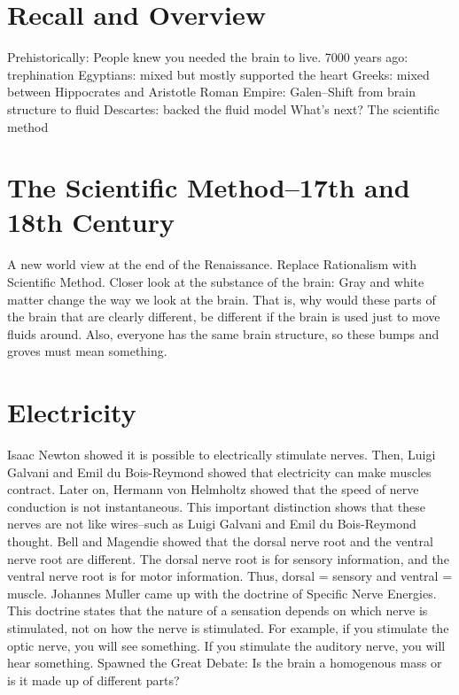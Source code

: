\section{Recall and Overview}

Prehistorically: People knew you needed the brain to live.
7000 years ago: trephination
Egyptians: mixed but mostly supported the heart
Greeks: mixed between Hippocrates and Aristotle
Roman Empire: Galen--Shift from brain structure to fluid
Descartes: backed the fluid model
What's next? The scientific method

\section{The Scientific Method--17th and 18th Century}

A new world view at the end of the Renaissance.
	Replace Rationalism with Scientific Method.
Closer look at the substance of the brain:
    Gray and white matter change the way we look at the brain. That is, why would these parts of the brain that are clearly different, be different if the brain is used just to move fluids around.
    Also, everyone has the same brain structure, so these bumps and groves must mean something.

\section{Electricity}

Isaac Newton showed it is possible to electrically stimulate nerves.
Then, Luigi Galvani and Emil du Bois-Reymond showed that electricity can make muscles contract.
Later on, Hermann von Helmholtz showed that the speed of nerve conduction is not instantaneous.
    This important distinction shows that these nerves are not like wires--such as Luigi Galvani and Emil du Bois-Reymond thought.
Bell and Magendie showed that the dorsal nerve root and the ventral nerve root are different.
    The dorsal nerve root is for sensory information, and the ventral nerve root is for motor information.
    Thus, dorsal = sensory and ventral = muscle.
Johannes Mu\"ller came up with the doctrine of Specific Nerve Energies.
    This doctrine states that the nature of a sensation depends on which nerve is stimulated, not on how the nerve is stimulated.
    For example, if you stimulate the optic nerve, you will see something. If you stimulate the auditory nerve, you will hear something.
    Spawned the Great Debate: Is the brain a homogenous mass or is it made up of different parts?

